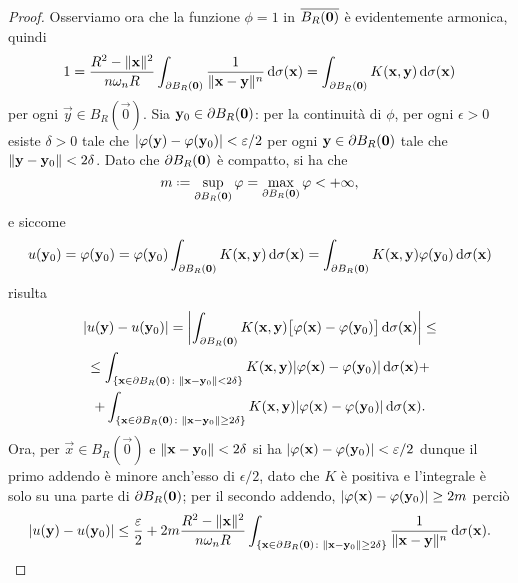\begin{proof}
    Osserviamo ora che la funzione $\phi=1$ in $\clos{B_R(\vec 0)}$ è evidentemente armonica, quindi
    \begin{equation}
        1=
        \frac{R^2-\norm{\vec x}^2}{n\omega_n R}\int_{\boundary B_R(\vec 0)}\frac1{\norm{\vec x-\vec y}^n}\,\dd\sigma(\vec x)=
        \int_{\boundary B_R(\vec 0)}K(\vec x,\vec y)\,\dd\sigma(\vec x)
    \end{equation}
    per ogni $\vec y\in B_R(\vec 0)$.
    Sia $\vec y_0\in\boundary B_R(\vec 0)$: per la continuità di $\phi$, per ogni $\epsilon>0$ esiste $\delta>0$ tale che $\abs{\phi(\vec y)-\phi(\vec y_0)}<\epsilon/2$ per ogni $\vec y\in\boundary B_R(\vec 0)$ tale che $\norm{\vec y-\vec y_0}<2\delta$.
    Dato che $\boundary B_R(\vec 0)$ è compatto, si ha che
    \begin{equation}
        m\defeq
        \sup_{\boundary B_R(\vec 0)}\phi=
        \max_{\boundary B_R(\vec 0)}\phi<
        +\infty,
    \end{equation}
    e siccome
    \begin{equation}
        u(\vec y_0)=
        \phi(\vec y_0)=
        \phi(\vec y_0)\int_{\boundary B_R(\vec 0)}K(\vec x,\vec y)\,\dd\sigma(\vec x)=
        \int_{\boundary B_R(\vec 0)}K(\vec x,\vec y)\phi(\vec y_0)\,\dd\sigma(\vec x)
    \end{equation}
    risulta
    \begin{multline}
        \abs{u(\vec y)-u(\vec y_0)}=
        \abs[\bigg]{\int_{\boundary B_R(\vec 0)}K(\vec x,\vec y)\bigl[\phi(\vec x)-\phi(\vec y_0)\bigr]\,\dd\sigma(\vec x)}\le\\\le
        \int_{\{\vec x\in\boundary B_R(\vec 0)\colon \norm{\vec x-\vec y_0}<2\delta\}}K(\vec x,\vec y)\abs{\phi(\vec x)-\phi(\vec y_0)}\,\dd\sigma(\vec x)+\\+
        \int_{\{\vec x\in\boundary B_R(\vec 0)\colon \norm{\vec x-\vec y_0}\ge 2\delta\}}K(\vec x,\vec y)\abs{\phi(\vec x)-\phi(\vec y_0)}\,\dd\sigma(\vec x).
    \end{multline}
    Ora, per $\vec x\in B_R(\vec 0)$ e $\norm{\vec x-\vec y_0}<2\delta$ si ha $\abs{\phi(\vec x)-\phi(\vec y_0)}<\epsilon/2$ dunque il primo addendo è minore anch'esso di $\epsilon/2$, dato che $K$ è positiva e l'integrale è solo su una parte di $\boundary B_R(\vec 0)$; per il secondo addendo, $\abs{\phi(\vec x)-\phi(\vec y_0)}\ge 2m$ perciò
    \begin{equation}
        \abs{u(\vec y)-u(\vec y_0)}\le
        \frac{\epsilon}2+2m\frac{R^2-\norm{\vec x}^2}{n\omega_n R}\int_{\{\vec x\in\boundary B_R(\vec 0)\colon \norm{\vec x-\vec y_0}\ge 2\delta\}}\frac1{\norm{\vec x-\vec y}^n}\,\dd\sigma(\vec x).

\end{equation}
\end{proof}
